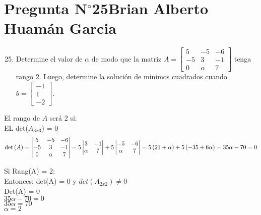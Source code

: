\section{Pregunta N$^{\circ}$25\qquad Brian Alberto Huamán Garcia}

\begin{frame}
	\begin{enumerate}\setcounter{enumi}{24}
		\item

		      Determine el valor de $\alpha$ de modo que la matriz
		      \begin{math}
			      A=
			      \begin{bmatrix}
				      5  & -5     & -6 \\
				      -5 & 3      & -1 \\
				      0  & \alpha & 7
			      \end{bmatrix}
		      \end{math}
		      tenga rango $2$.
		      Luego, determine la solución de mínimos cuadrados cuando
		      \begin{math}
			      b=
			      \begin{bmatrix}
				      -1 \\
				      1  \\
				      -2
			      \end{bmatrix}
		      \end{math}.
	\end{enumerate}

	\begin{solution}
		El rango de $A$ será $2$ si: \\
        EL det($A_{3x3}$) = 0
		\begin{equation*}
			\det\left(A\right)=
			\begin{vmatrix}
				5  & -5     & -6 \\
				-5 & 3      & -1 \\
				0  & \alpha & 7
			\end{vmatrix}=
			5\begin{vmatrix}
				3      & -1 \\
				\alpha & 7
			\end{vmatrix}+
			5\begin{vmatrix}
				-5     & -6 \\
				\alpha & 7
			\end{vmatrix}=
			5\left(21+\alpha\right)+
			5\left(-35+6\alpha\right) = 35 \alpha - 70 = 0 \\
		\end{equation*}
  
    Si Rang(A) = 2: \\
    Entonces: det(A) = 0  y $det(A_{2x2})\neq 0 $ \\
    
    Det(A) = 0 \\
    $35\alpha - 70 = 0 $ \\
    $35 \alpha = 70$ \\
    $\alpha = 2$ \\

    



 
	\end{solution}
\end{frame}

